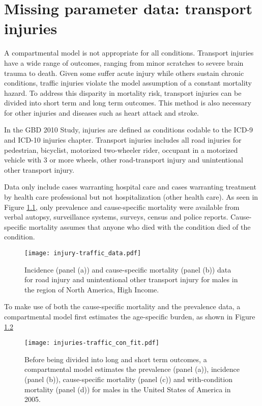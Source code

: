 \chapter{Missing parameter data: transport injuries}
\label{applications-double_dismod}

A compartmental model is not appropriate for all conditions.  Transport injuries have a wide range of outcomes, ranging from minor scratches to severe brain trauma to death.  Given some suffer acute injury while others sustain chronic conditions, traffic injuries violate the model assumption of a constant mortality hazard.  To address this disparity in mortality risk, transport injuries can be divided into short term and long term outcomes.  This method is also necessary for other injuries and diseases such as heart attack and stroke.

In the GBD 2010 Study, injuries are defined as conditions codable to the ICD-9 and ICD-10 injuries chapter.  Transport injuries includes all road injuries for pedestrian, bicyclist, motorized two-wheeler rider, occupant in a motorized vehicle with 3 or more wheels, other road-transport injury and unintentional other transport injury.

Data only include cases warranting hospital care and cases warranting treatment by health care professional but not hospitalization (other health care).  As seen in Figure \ref{fig:app-injury traffic data}, only prevalence and cause-specific mortality were available from verbal autopsy, surveillance systems, surveys, census and police reports.  Cause-specific mortality assumes that anyone who died with the condition died of the condition.

    \begin{figure}[h]
        \begin{center}
            \texttt{[image: injury-traffic\_data.pdf]}
            \caption{Incidence (panel (a)) and cause-specific mortality (panel (b)) data for road injury and unintentional other transport injury for males in the region of North America, High Income.}
            \label{fig:app-injury traffic data}
        \end{center}
    \end{figure}

To make use of both the cause-specific mortality and the prevalence data, a compartmental model first estimates the age-specific burden, as shown in Figure \ref{fig:app-injury traffic fit}

    \begin{figure}[h]
        \begin{center}
            \texttt{[image: injuries-traffic\_con\_fit.pdf]}
            \caption{Before being divided into long and short term outcomes, a compartmental model estimates the prevalence (panel (a)), incidence (panel (b)), cause-specific mortality (panel (c)) and with-condition mortality (panel (d)) for males in the United States of America in 2005.}
            \label{fig:app-injury traffic fit}
        \end{center}
    \end{figure}


